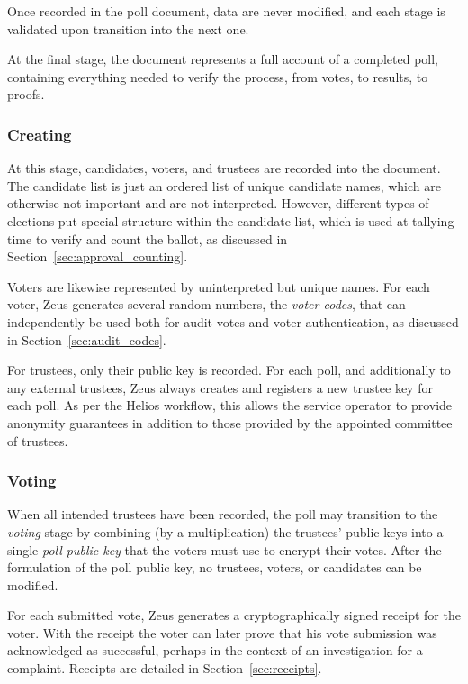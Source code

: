 \documentclass[letterpaper,10pt]{article}
\begin{document}
Once recorded in the poll document, data are never modified,
and each stage is validated upon transition into the next one.

At the final stage,
the document represents a full account of a completed poll,
containing everything needed to verify the process,
from votes, to results, to proofs.

\subsubsection{Creating}
At this stage, candidates, voters, and trustees
are recorded into the document.
The candidate list is just an ordered list of unique candidate names,
which are otherwise not important and are not interpreted.
However, different types of elections put special structure
within the candidate list, which is used at tallying time
to verify and count the ballot,
as discussed in Section~\ref{sec:approval_counting}.

Voters are likewise represented by uninterpreted but unique names.
For each voter,
Zeus generates several random numbers, the \emph{voter codes}, that can
independently be used both for audit votes and voter authentication,
as discussed in Section~\ref{sec:audit_codes}.

For trustees, only their public key is recorded.
For each poll, and additionally to any external trustees,
Zeus always creates and registers a new trustee key for each poll.
As per the Helios workflow, this allows the service operator to
provide anonymity guarantees in addition to those provided by
the appointed committee of trustees.

\subsubsection{Voting}
\label{sec:voting}
When all intended trustees have been recorded,
the poll may transition to the \emph{voting} stage
by combining (by a multiplication)
the trustees' public keys into a single \emph{poll public key}
that the voters must use to encrypt their votes.
After the formulation of the poll public key,
no trustees, voters, or candidates can be modified.

For each submitted vote, Zeus generates a cryptographically signed
receipt for the voter.
With the receipt the voter can later prove that
his vote submission was acknowledged as successful,
perhaps in the context of an investigation for a complaint.
Receipts are detailed in Section~\ref{sec:receipts}.
\end{document}
